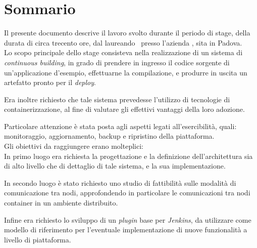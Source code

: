 
\cleardoublepage
{}
{}
\begingroup
\let\clearpage\relax
\let\cleardoublepage\relax
\let\cleardoublepage\relax

\chapter*{Sommario}

Il presente documento descrive il lavoro svolto durante il periodo di stage, della durata di circa trecento ore, dal laureando \myName\ presso l'azienda \myCompany, sita in Padova.\\

Lo scopo principale dello stage consisteva nella realizzazione di un sistema di \textit{\gls{continuous building}}, in grado di prendere in ingresso il codice sorgente di un'applicazione d'esempio, effettuarne la compilazione, e produrre in uscita un \gls{artefatto} pronto per il \textit{\gls{deploy}}.

Era inoltre richiesto che tale sistema prevedesse l'utilizzo di tecnologie di containerizzazione, al fine di valutare gli effettivi vantaggi della loro adozione.

Particolare attenzione è stata posta agli aspetti legati all'esercibilità, quali: monitoraggio, aggiornamento, backup e ripristino della piattaforma.\\

Gli obiettivi da raggiungere erano molteplici:\\
In primo luogo era richiesta la progettazione e la definizione dell'architettura sia di alto livello che di dettaglio di tale sistema, e la sua implementazione.

In secondo luogo è stato richiesto uno studio di fattibilità sulle modalità di comunicazione tra nodi, approfondendo in particolare le comunicazioni tra nodi container in un ambiente distribuito.

Infine era richiesto lo sviluppo di un \textit{\gls{plugin}} base per \textit{Jenkins}, da utilizzare come modello di riferimento per l'eventuale implementazione di nuove funzionalità a livello di piattaforma.

%
%

\endgroup			

\vfill


